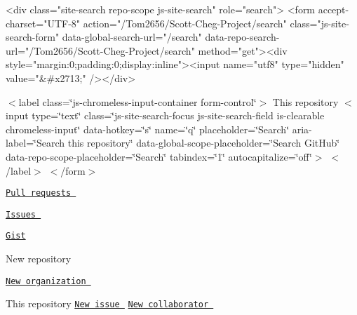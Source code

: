 \begin{DoxyVerb}  <div class="site-search repo-scope js-site-search" role="search">
      <form accept-charset="UTF-8" action="/Tom2656/Scott-Cheg-Project/search" class="js-site-search-form" data-global-search-url="/search" data-repo-search-url="/Tom2656/Scott-Cheg-Project/search" method="get"><div style="margin:0;padding:0;display:inline"><input name="utf8" type="hidden" value="&#x2713;" /></div>
\end{DoxyVerb}
 $<$label class=\char`\"{}js-\/chromeless-\/input-\/container form-\/control\char`\"{}$>$ This repository $<$input type=\char`\"{}text\char`\"{} class=\char`\"{}js-\/site-\/search-\/focus js-\/site-\/search-\/field is-\/clearable chromeless-\/input\char`\"{} data-\/hotkey=\char`\"{}s\char`\"{} name=\char`\"{}q\char`\"{} placeholder=\char`\"{}\+Search\char`\"{} aria-\/label=\char`\"{}\+Search this repository\char`\"{} data-\/global-\/scope-\/placeholder=\char`\"{}\+Search Git\+Hub\char`\"{} data-\/repo-\/scope-\/placeholder=\char`\"{}\+Search\char`\"{} tabindex=\char`\"{}1\char`\"{} autocapitalize=\char`\"{}off\char`\"{}$>$ $<$/label$>$ $<$/form$>$ 


\begin{DoxyItemize}
\item \href{/pulls}{\tt Pull requests }  
\item \href{/issues}{\tt Issues }  
\item \href{https://gist.github.com/}{\tt Gist}  
\end{DoxyItemize}


\begin{DoxyItemize}
\item  \href{/notifications}{\tt } 




\item \href{/new}{\tt }

 
\begin{DoxyItemize}
\item 
\end{DoxyItemize}New repository 

 \href{/organizations/new}{\tt New organization }

   This repository  \href{/Tom2656/Scott-Cheg-Project/issues/new}{\tt New issue } \href{/Tom2656/Scott-Cheg-Project/settings/collaboration}{\tt New collaborator }

 
\end{DoxyItemize}

  \href{/Tom2656}{\tt }

